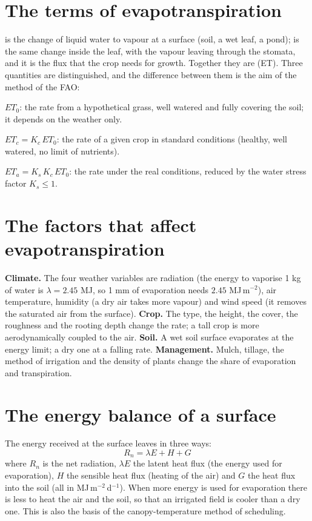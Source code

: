 \section{The terms of evapotranspiration}
 is the change of liquid water to vapour at a surface (soil, a wet leaf, a pond);  is the same change inside the leaf, with the vapour leaving through the stomata, and it is the flux that the crop needs for growth. Together they are  (ET). Three quantities are distinguished, and the difference between them is the aim of the method of the FAO:
\begin{exlist}
\item {} $ET_0$: the rate from a hypothetical grass, well watered and fully covering the soil; it depends on the weather only.
\item {} $ET_c=K_c\,ET_0$: the rate of a given crop in standard conditions (healthy, well watered, no limit of nutrients).
\item {} $ET_a=K_s\,K_c\,ET_0$: the rate under the real conditions, reduced by the water stress factor $K_s\le1$.
\end{exlist}

\section{The factors that affect evapotranspiration}
\textbf{Climate.} The four weather variables are radiation (the energy to vaporise 1 kg of water is $\lambda=2.45$ MJ, so 1 mm of evaporation needs $2.45$ MJ\,m$^{-2}$), air temperature, humidity (a dry air takes more vapour) and wind speed (it removes the saturated air from the surface). \textbf{Crop.} The type, the height, the cover, the roughness and the rooting depth change the rate; a tall crop is more aerodynamically coupled to the air. \textbf{Soil.} A wet soil surface evaporates at the energy limit; a dry one at a falling rate. \textbf{Management.} Mulch, tillage, the method of irrigation and the density of plants change the share of evaporation and transpiration.

\section{The energy balance of a surface}
The energy received at the surface leaves in three ways:
\begin{equation*}\boxed{R_n=\lambda E+H+G}\end{equation*}
where $R_n$ is the net radiation, $\lambda E$ the latent heat flux (the energy used for evaporation), $H$ the sensible heat flux (heating of the air) and $G$ the heat flux into the soil (all in MJ\,m$^{-2}$\,d$^{-1}$). When more energy is used for evaporation there is less to heat the air and the soil, so that an irrigated field is cooler than a dry one. This is also the basis of the canopy-temperature method of scheduling.

